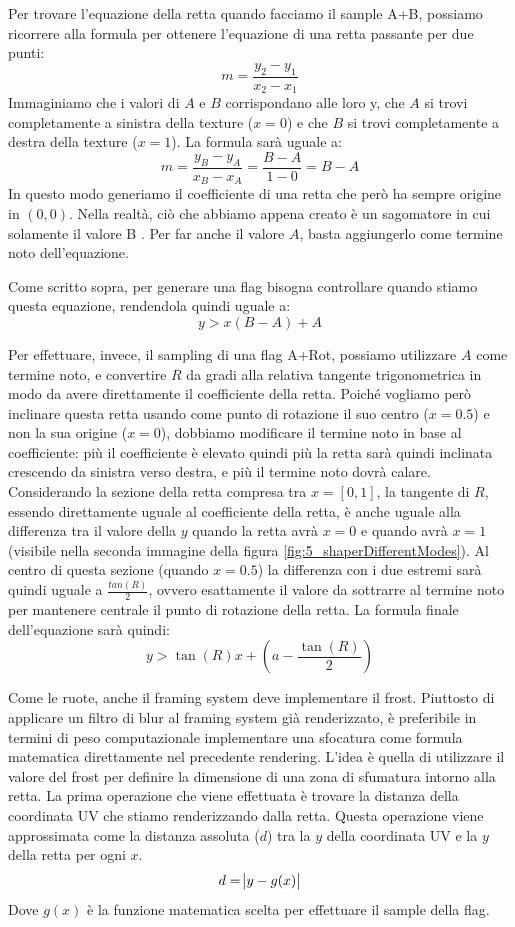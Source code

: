 \documentclass[main.tex]{subfiles}
\begin{document}
Per trovare l'equazione della retta quando facciamo il sample A+B, possiamo ricorrere alla formula per ottenere l'equazione di una retta passante per due punti:
\[m = \frac{y_2 - y_1}{x_2 - x_1}\]
Immaginiamo che i valori di $A$ e $B$ corrispondano alle loro y, che $A$ si trovi completamente a sinistra della texture ($x = 0$) e che $B$ si trovi completamente a destra della texture ($x = 1$). La formula sarà uguale a:
\[m = \frac{y_B - y_A}{x_B - x_A} = \frac{B - A}{1 - 0} = B - A\]
In questo modo generiamo il coefficiente di una retta che però ha sempre origine in $(0, 0)$. Nella realtà, ciò che abbiamo appena creato è un sagomatore in cui solamente il valore B . Per far  anche il valore $A$, basta aggiungerlo come termine noto dell'equazione.

Come scritto sopra, per generare una flag bisogna controllare quando stiamo  questa equazione, rendendola quindi uguale a:
\[y > x(B - A) + A\]
\newline

Per effettuare, invece, il sampling di una flag A+Rot, possiamo utilizzare $A$ come termine noto, e convertire $R$ da gradi alla relativa tangente trigonometrica in modo da avere direttamente il coefficiente della retta. Poiché vogliamo però inclinare questa retta usando come punto di rotazione il suo centro ($x = 0.5$) e non la sua origine ($x = 0$), dobbiamo modificare il termine noto in base al coefficiente: più il coefficiente è elevato quindi più la retta sarà quindi inclinata crescendo da sinistra verso destra, e più il termine noto dovrà calare. Considerando la sezione della retta compresa tra $x = [0, 1]$, la tangente di $R$, essendo direttamente uguale al coefficiente della retta, è anche uguale alla differenza tra il valore della $y$ quando la retta avrà $x = 0$ e quando avrà $x = 1$ (visibile nella seconda immagine della figura \ref{fig:5_shaperDifferentModes}). Al centro di questa sezione (quando $x = 0.5$) la differenza con i due estremi sarà quindi uguale a $\frac{tan(R)}{2}$, ovvero esattamente il valore da sottrarre al termine noto per mantenere centrale il punto di rotazione della retta. La formula finale dell'equazione sarà quindi:
\[y > \tan(R)x + (a - \frac{\tan(R)}{2})\]

Come le ruote, anche il framing system deve implementare il frost. Piuttosto di applicare un filtro di blur al framing system già renderizzato, è preferibile in termini di peso computazionale implementare una sfocatura come formula matematica direttamente nel precedente rendering. L'idea è quella di utilizzare il valore del frost per definire la dimensione di una zona di sfumatura intorno alla retta. La prima operazione che viene effettuata è trovare la distanza della coordinata UV che stiamo renderizzando dalla retta. Questa operazione viene approssimata come la distanza assoluta ($d$) tra la $y$ della coordinata UV e la $y$ della retta per ogni $x$.
\[d = \abs{y - g(x)}\]
Dove $g(x)$ è la funzione matematica scelta per effettuare il sample della flag.
\end{document}

